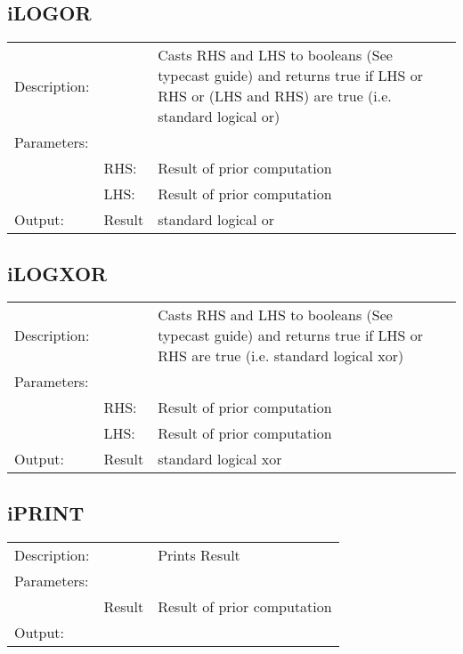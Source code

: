 \documentclass{standalone}
\begin{document}
\subsection{iLOGOR}
\begin{tabular}{l l p{10cm}}
Description: & ~    & Casts RHS and LHS to booleans (See typecast guide) and returns true if LHS or RHS or (LHS and RHS) are true (i.e. standard logical or)\\
Parameters:  & ~ & ~ \\
~			 & RHS: & Result of prior computation\\
~			 & LHS: & Result of prior computation\\
Output:      & Result & standard logical or\\
\end{tabular}

\subsection{iLOGXOR}
\begin{tabular}{l l p{10cm}}
Description: & ~    & Casts RHS and LHS to booleans (See typecast guide) and returns true if LHS or RHS are true (i.e. standard logical xor)\\
Parameters:  & ~ & ~ \\
~			 & RHS: & Result of prior computation\\
~			 & LHS: & Result of prior computation\\
Output:      & Result & standard logical xor\\
\end{tabular}

\subsection{iPRINT}
\begin{tabular}{l l p{10cm}}
Description: & ~    & Prints Result\\
Parameters:  & ~ & ~ \\
~			 & Result & Result of prior computation\\
Output:      & ~ & ~\\
\end{tabular}
\end{document}
